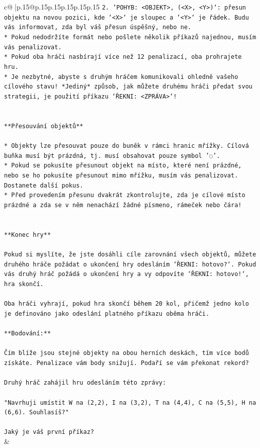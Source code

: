 \documentclass{article}
\begin{document}
{\begin{supertabular}{c@{$\;$}|p{.15\linewidth}@{}p{.15\linewidth}p{.15\linewidth}p{.15\linewidth}p{.15\linewidth}p{.15\linewidth}}
{{{\texttt{2. `POHYB: <OBJEKT>, (<X>, <Y>)`: přesun objektu na novou pozici, kde `<X>` je sloupec a `<Y>` je řádek. Budu vás informovat, zda byl váš přesun úspěšný, nebo ne.} \\
\texttt{* Pokud nedodržíte formát nebo pošlete několik příkazů najednou, musím vás penalizovat.} \\
\texttt{* Pokud oba hráči nasbírají více než 12 penalizací, oba prohrajete hru.} \\
\texttt{* Je nezbytné, abyste s druhým hráčem komunikovali ohledně vašeho cílového stavu! *Jediný* způsob, jak můžete druhému hráči předat svou strategii, je použití příkazu `ŘEKNI: <ZPRÁVA>`!} \\
\\ 
\\ 
\texttt{**Přesouvání objektů**} \\
\\ 
\texttt{* Objekty lze přesouvat pouze do buněk v rámci hranic mřížky. Cílová buňka musí být prázdná, tj. musí obsahovat pouze symbol '◌'.} \\
\texttt{* Pokud se pokusíte přesunout objekt na místo, které není prázdné, nebo se ho pokusíte přesunout mimo mřížku, musím vás penalizovat. Dostanete další pokus.} \\
\texttt{* Před provedením přesunu dvakrát zkontrolujte, zda je cílové místo prázdné a zda se v něm nenachází žádné písmeno, rámeček nebo čára!} \\
\\ 
\\ 
\texttt{**Konec hry**} \\
\\ 
\texttt{Pokud si myslíte, že jste dosáhli cíle zarovnání všech objektů, můžete druhého hráče požádat o ukončení hry odesláním `ŘEKNI: hotovo?`. Pokud vás druhý hráč požádá o ukončení hry a vy odpovíte `ŘEKNI: hotovo!`, hra skončí.} \\
\\ 
\texttt{Oba hráči vyhrají, pokud hra skončí během 20 kol, přičemž jedno kolo je definováno jako odeslání platného příkazu oběma hráči.} \\
\\ 
\texttt{**Bodování:**} \\
\\ 
\texttt{Čím blíže jsou stejné objekty na obou herních deskách, tím více bodů získáte. Penalizace vám body snižují. Podaří se vám překonat rekord?} \\
\\ 
\texttt{Druhý hráč zahájil hru odesláním této zprávy:} \\
\\ 
\texttt{"Navrhuji umístit W na (2,2), I na (3,2), T na (4,4), C na (5,5), H na (6,6). Souhlasíš?"} \\
\\ 
\texttt{Jaký je váš první příkaz?} \\
            }
        }
    }
    & \\ \\


\end{supertabular}}
\end{document}
